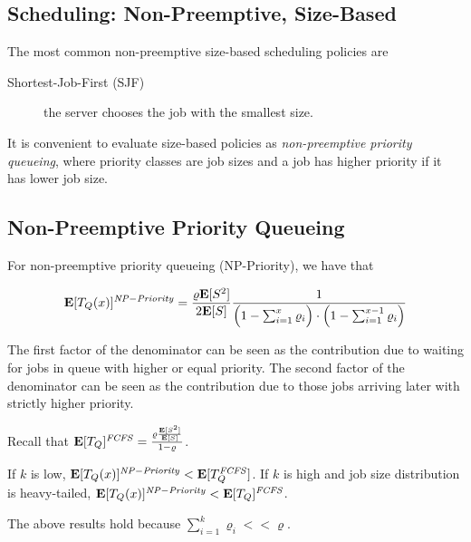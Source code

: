 \subsection{Scheduling: Non-Preemptive, Size-Based}
\label{sec:Scheduling-Non-Preemptive-Size-Based}

The most common non-preemptive size-based scheduling policies are

\begin{description}
	
	\item [Shortest-Job-First (SJF)] the server chooses the job with the smallest size.
	
\end{description}

It is convenient to evaluate size-based policies as \textit{non-preemptive priority queueing}, where priority classes are job sizes and a job has higher priority if it has lower job size.




\subsection{Non-Preemptive Priority Queueing}
\label{sec:NP-Priority}

For non-preemptive priority queueing (NP-Priority), we have that

\begin{equation}
\label{eqn:NP-Priority-Queue-Time-Size}
\expected{T_{Q}(x)}^{\mathit{NP-Priority}}=
\frac{\varrho\expected{S^{2}}}{2\expected{S}}
\frac{1}{\Big(1-\sum_{i=1}^{x}\varrho_{i}\Big)\cdot\Big(1-\sum_{i=1}^{x-1}\varrho_{i}\Big)}
\end{equation}

The first factor of the denominator can be seen as the contribution due to waiting for jobs in queue with higher or equal priority.
The second factor of the denominator can be seen as the contribution due to those jobs arriving later with strictly higher priority.

Recall that $\mathbf{E}[T_{Q}]^{\mathit{FCFS}}=\frac{\varrho\frac{\mathbf{E}[S^{2}]}{\mathbf{E}[S]}}{1-\varrho}$.

If $k$ is low, $\mathbf{E}[T_{Q}(x)]^{\mathit{NP-Priority}}<\mathbf{E}[T_{Q}^{\mathit{FCFS}}]$.
If $k$ is high and job size distribution is heavy-tailed, $\mathbf{E}[T_{Q}(x)]^{\mathit{NP-Priority}}<\mathbf{E}[T_{Q}]^{\mathit{FCFS}}$.

The above results hold because $\sum_{i=1}^{k}\varrho_{i}<<\varrho$.

